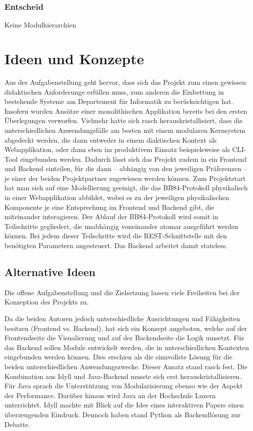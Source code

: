 \documentclass[a4paper,10.2pt,pdftex]{scrartcl}%
\begin{document}
\subsubsection{Entscheid}
Keine Modulhierarchien 


\section{Ideen und Konzepte}
Aus der Aufgabenstellung geht hervor, dass sich das Projekt zum einen gewissen didaktischen Anforderunge erfüllen muss, zum anderen die Einbettung in bestehende Systeme am Departement für Informatik zu berücksichtigen hat. Insofern wurden Ansätze einer monolithischen Applikation bereits bei den ersten Überlegungen verworfen. Vielmehr hatte sich rasch herauskristallisiert, dass die unterschiedlichen Anwendungsfälle am besten mit einem modularen Kernsystem abgedeckt werden, die dann entweder in einem diaktischen Kontext als Webapplikation, oder dann eben im produktivem Einsatz beispielsweise als CLI-Tool eingebunden werden. Dadurch lässt sich das Projekt zudem in ein Frontend und Backend einteilen, für die dann -- abhängig von den jeweiligen Präferenzen --  je einer der beiden Projektpartner zugewiesen werden können. Zum Projektstart hat man sich auf eine Modellierung geeinigt, die das BB84-Protokoll physikalisch in einer Webapplikation abbildet, wobei es zu der jeweiligen physikalischen Komponente je eine Entsprechung im Frontend und Backend gibt, die miteinander interagieren. Der Ablauf der BB84-Protokoll wird somit in Teilschritte gegliedert, die unabhängig voneinander atomar ausgeführt werden können. Bei jedem dieser Teilschritte wird die REST-Schnittstelle mit den benötigten Parametern angesteuert. Das Backend arbeitet damit stateless. 

\subsection{Alternative Ideen}
Die offene Aufgabenstellung und die Zielsetzung lassen viele Freiheiten bei der Konzeption des Projekts zu.

Da die beiden Autoren jedoch unterschiedliche Ausrichtungen und Fähigkeiten besitzen (Frontend vs. Backend), hat sich ein Konzept angeboten, welche auf der Frontendseite die Visualierung und auf der Backendseite die Logik umsetzt. Für das Backend sollen Module entwickelt werden, die in unterschiedlichen Kontexten eingebunden werden können. Dies erschien als die sinnvollste Lösung für die beiden unterschiedlichen Anwendungszwecke.  Dieser Ansatz stand rasch fest. Die Kombination aus Idyll und Java-Backend musste sich erst herauskristallisieren. Für Java sprach die Unterstützung von Modularisierung ebenso wie der Aspekt der Performance. Darüber hinaus wird Java an der Hochschule Luzern unterrichtet. Idyll machte mit Blick auf die Idee eines interaktiven Papers einen überzeugenden Eindruck. Dennoch haben stand Python als Backendlösung zur Debatte. 
\end{document}
